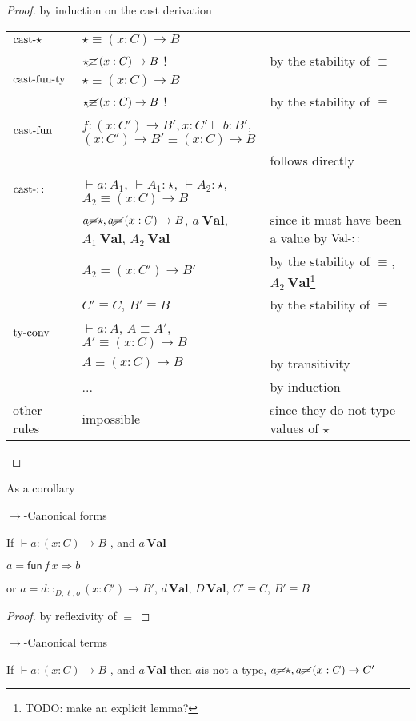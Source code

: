 \begin{proof}
by induction on the cast derivation

\begin{tabular}{lll}
$\operatorname{cast-\star}$ & $\star\equiv\left(x:C\right)\rightarrow B$ & \tabularnewline
 & $\star\cancel{\equiv}\left(x:C\right)\rightarrow B$ ! & by the stability of $\equiv$\tabularnewline
$\operatorname{cast-fun-ty}$ & $\star\equiv\left(x:C\right)\rightarrow B$ & \tabularnewline
 & $\star\cancel{\equiv}\left(x:C\right)\rightarrow B$ ! & by the stability of $\equiv$\tabularnewline
$\operatorname{cast-fun}$ & \multicolumn{2}{l}{$f:\left(x:C'\right)\rightarrow B',x:C'\vdash b:B'$, $\left(x:C'\right)\rightarrow B'\equiv\left(x:C\right)\rightarrow B$}\tabularnewline
 &  & follows directly\tabularnewline
$\operatorname{cast-::}$ & $\vdash a:A_{1}$, $\vdash A_{1}:\star$, $\vdash A_{2}:\star$, $A_{2}\equiv\left(x:C\right)\rightarrow B$ & \tabularnewline
 & $a\cancel{=}\star,a\cancel{=}\left(x:C\right)\rightarrow B$, $a\:\textbf{Val}$,
$A_{1}\:\textbf{Val}$, $A_{2}\:\textbf{Val}$ & since it must have been a value by $\operatorname{Val-::}$\tabularnewline
 & $A_{2}=\left(x:C'\right)\rightarrow B'$ & by the stability of $\equiv$, $A_{2}\:\textbf{Val}$\footnote{TODO: make an explicit lemma?}\tabularnewline
 & $C'\equiv C$, $B'\equiv B$ & by the stability of $\equiv$\tabularnewline
$\operatorname{ty-conv}$ & $\vdash a:A$, $A\equiv A'$, $A'\equiv\left(x:C\right)\rightarrow B$ & \tabularnewline
 & $A\equiv\left(x:C\right)\rightarrow B$ & by transitivity\tabularnewline
 & ... & by induction\tabularnewline
other rules & impossible & since they do not type values of $\star$\tabularnewline
\end{tabular}
\end{proof}
As a corollary
\begin{cor}
$\rightarrow$-Canonical forms

If $\vdash a:\left(x:C\right)\rightarrow B$ , and $a\,\textbf{Val}$

$a=\mathsf{fun}\,f\,x\Rightarrow b$ 

or $a=d::_{D,\ensuremath{\ell},o}\left(x:C'\right)\rightarrow B'$,
$d\,\textbf{Val}$, $D\,\textbf{Val}$, $C'\equiv C$, $B'\equiv B$ 
\end{cor}

\begin{proof}
by reflexivity of $\equiv$
\end{proof}
\begin{cor}
$\rightarrow$-Canonical terms

If $\vdash a:\left(x:C\right)\rightarrow B$ , and $a\,\textbf{Val}$
then $a$is not a type, $a\cancel{=}\star,a\cancel{=}\left(x:C\right)\rightarrow C'$
\end{cor}

